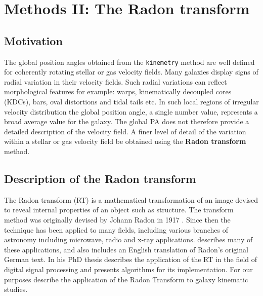 \section{Methods II: The Radon transform}
\label{sec:Radon}

\subsection{Motivation}
\label{sec:motivation}
The global position angles obtained from the \texttt{kinemetry} method are well defined for coherently rotating stellar or gas velocity fields. Many galaxies display signs of radial variation in their velocity fields. Such radial variations can reflect morphological features for example: warps, kinematically decoupled cores (KDCs), bars, oval distortions and tidal tails etc. In such local regions of irregular velocity distribution the global position angle, a single number value, represents a broad average value for the galaxy. The global PA does not therefore provide a detailed description of the velocity field. A finer level of detail of the variation within a stellar or gas velocity field be obtained using the \textbf{Radon transform} method.

\subsection{Description of the Radon transform}

The Radon transform (RT) is a mathematical transformation of an image devised to reveal internal properties of an object such as structure. The transform method was originally devised by Johann Radon in 1917 \citep{radon1917determination}. Since then the technique has been applied to many fields, including various branches of astronomy including microwave, radio and x-ray applications. \citet{deans2007radon} describes many of these applications, and also includes an English translation of Radon's original German text. In his PhD thesis \citet{7910dc8d5b654c90ac4bc94c67d06f01} describes the application of the RT in the field of digital signal processing and presents algorithms for its implementation. For our purposes \cite{2018MNRAS.480.2217S} describe the application of the Radon Transform to galaxy kinematic studies.  

